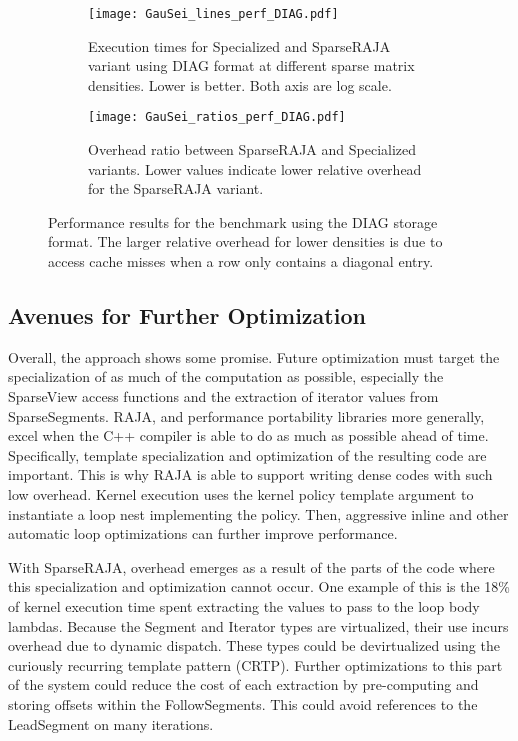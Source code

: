 \begin{figure}
  \begin{subfigure}{0.49\columnwidth}
    \texttt{[image: GauSei\_lines\_perf\_DIAG.pdf]}
    \caption{Execution times for Specialized and SparseRAJA variant using DIAG format at different sparse matrix densities. Lower is better. Both axis are log scale.}\label{GauSeiExecTimeDIAG}
  \end{subfigure}
  \hspace{0.02\columnwidth}
  \begin{subfigure}{0.49\columnwidth}
    \texttt{[image: GauSei\_ratios\_perf\_DIAG.pdf]}
    \caption{Overhead ratio between SparseRAJA and Specialized variants. Lower values indicate lower relative overhead for the SparseRAJA variant.}\label{GauSeiRatioDIAG}
  \end{subfigure}
  \caption{Performance results for the \GauSei{} benchmark using the DIAG storage format. The larger relative overhead for lower densities is due to access cache misses when a row only contains a diagonal entry.}\label{GauSeiPerfDIAG}
\end{figure}


\subsection{Avenues for Further Optimization}

Overall, the approach shows some promise.
Future optimization must target the specialization of as much of the computation as possible, especially the SparseView access functions and the extraction of iterator values from SparseSegments.
RAJA, and performance portability libraries more generally, excel when the C++ compiler is able to do as much as possible ahead of time.
Specifically, template specialization and optimization of the resulting code are important.
This is why RAJA is able to support writing dense codes with such low overhead.
Kernel execution uses the kernel policy template argument to instantiate a loop nest implementing the policy.
Then, aggressive inline and other automatic loop optimizations can further improve performance.

With SparseRAJA, overhead emerges as a result of the parts of the code where this specialization and optimization cannot occur.
One example of this is the 18\% of \GauSei{} kernel execution time spent extracting the values to pass to the loop body lambdas.
Because the Segment and Iterator types are virtualized, their use incurs overhead due to dynamic dispatch.
These types could be devirtualized using the curiously recurring template pattern (CRTP).
Further optimizations to this part of the system could reduce the cost of each extraction by pre-computing and storing offsets within the FollowSegments.
This could avoid references to the LeadSegment on many iterations.

